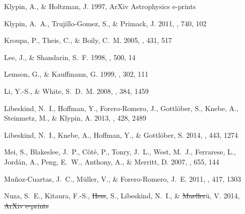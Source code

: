 \documentclass{emulateapj}
\providecommand{\DIFadd}[1]{{\protect\color{blue}\uwave{#1}}} %
\providecommand{\DIFdel}[1]{{\protect\color{red}\sout{#1}}}                      %
\providecommand{\DIFaddbegin}{} %
\providecommand{\DIFaddend}{} %
\providecommand{\DIFdelbegin}{} %
\providecommand{\DIFdelend}{} %
\begin{document}
\begin{thebibliography}{48}
{Klypin}, A., \& {Holtzman}, J. 1997, ArXiv Astrophysics e-prints

{Klypin}, A.~A., {Trujillo-Gomez}, S., \& {Primack}, J. 2011, \apj, 740, 102

{Kroupa}, P., {Theis}, C., \& {Boily}, C.~M. 2005, \aap, 431, 517

{Lee}, J., \& {Shandarin}, S.~F. 1998, \apj, 500, 14

{Lemson}, G., \& {Kauffmann}, G. 1999, \mnras, 302, 111

{Li}, Y.-S., \& {White}, S.~D.~M. 2008, \mnras, 384, 1459

{Libeskind}, N.~I., {Hoffman}, Y., {Forero-Romero}, J., {Gottl{\"o}ber}, S.,
  {Knebe}, A., {Steinmetz}, M., \& {Klypin}, A. 2013, \mnras, 428, 2489

{Libeskind}, N.~I., {Knebe}, A., {Hoffman}, Y., \& {Gottl{\"o}ber}, S. 2014,
  \mnras, 443, 1274

{Mei}, S., {Blakeslee}, J.~P., {C{\^o}t{\'e}}, P., {Tonry}, J.~L., {West},
  M.~J., {Ferrarese}, L., {Jord{\'a}n}, A., {Peng}, E.~W., {Anthony}, A., \&
  {Merritt}, D. 2007, \apj, 655, 144

{Mu{\~n}oz-Cuartas}, J.~C., {M{\"u}ller}, V., \& {Forero-Romero}, J.~E. 2011,
  \mnras, 417, 1303

\DIFdelbegin %
\DIFdelend \DIFaddbegin {}
\DIFaddend {Nuza}, S.~E., {Kitaura}, F.-S., {\DIFdelbegin \DIFdel{Hess}\DIFdelend \DIFaddbegin \DIFadd{He}{\DIFadd{\ss}\DIFaddend }\DIFaddbegin }\DIFaddend , S., {Libeskind}, N.~I., \&
  {\DIFdelbegin \DIFdel{Mueller}\DIFdelend \DIFaddbegin \DIFadd{M}{\"u\DIFaddend }\DIFaddbegin \DIFadd{ller}}\DIFaddend , V. 2014, \DIFdelbegin \DIFdel{ArXiv e-prints
}\DIFdelend \DIFaddbegin \mnras\DIFadd{, 445, 988
}\DIFaddend 


\end{thebibliography}
\end{document}
